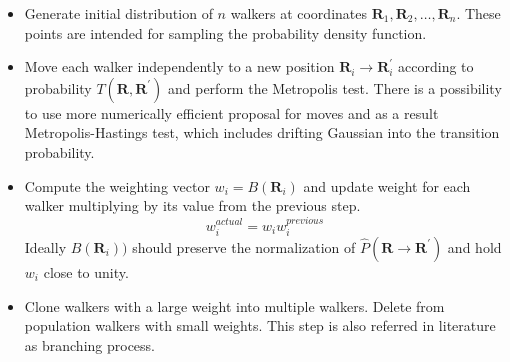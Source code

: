 \documentclass[twoside,english]{uiofysmaster}
\begin{document}
\begin{itemize}
	\item
	Generate initial distribution of $n$ walkers at coordinates $\boldsymbol{R}_1, \boldsymbol{R}_2, \dots , \boldsymbol{R}_n$. These points are intended for sampling the probability density function.
	\item
	Move each walker independently to a new position $\boldsymbol{R}_i \rightarrow \boldsymbol{R}_i^\prime$ according to probability $T(\boldsymbol{R}, \boldsymbol{R^\prime})$ and perform the Metropolis test. There is a possibility to use more numerically efficient proposal for moves and as a result Metropolis-Hastings test, which includes drifting Gaussian into the transition probability.
	\item
	Compute the weighting vector $w_i = B(\boldsymbol{R}_i)$ and update weight for each walker multiplying by its value from the previous step.
	\begin{equation}
	w_i^{actual} = w_i w_i^{previous}
	\end{equation}
	Ideally $B(\boldsymbol{R}_i))$ should preserve the normalization of $\hat{P}(\boldsymbol{R}\rightarrow\boldsymbol{R}^\prime)$ and hold $w_i$ close to unity.
	\item
	Clone walkers with a large weight into multiple walkers. Delete from population walkers with small weights.
	This step is also referred in literature as branching process.
	
\end{itemize}
\end{document}
